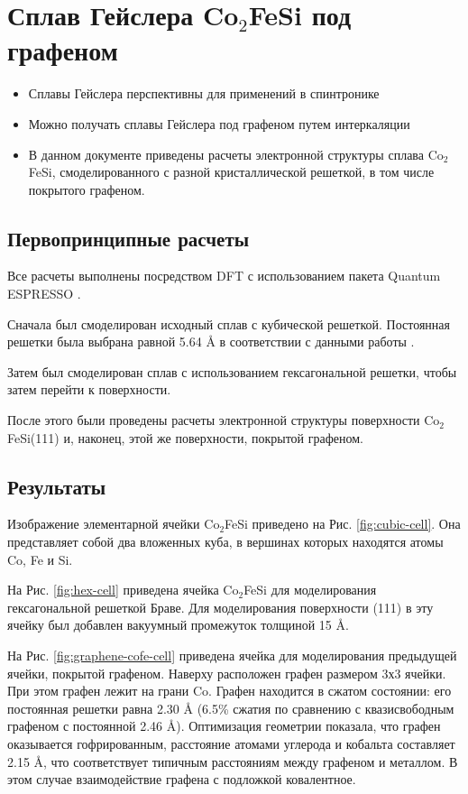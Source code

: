 \chapter{Сплав Гейслера Co$_2$FeSi под графеном}

\begin{itemize}
    \item Сплавы Гейслера перспективны для применений в спинтронике
    \item Можно получать сплавы Гейслера под графеном путем интеркаляции
    \item В данном документе приведены расчеты электронной структуры сплава Co$_2$FeSi, смоделированного с разной кристаллической решеткой, в том числе покрытого графеном.
\end{itemize}

\section{Первопринципные расчеты}

Все расчеты выполнены посредством DFT с использованием пакета Quantum ESPRESSO \cite{espresso}.

Сначала был смоделирован исходный сплав с кубической решеткой. Постоянная решетки была выбрана равной 5.64 Å в соответствии с данными работы \cite{doi:10.1063/1.2166205}.

Затем был смоделирован сплав с использованием гексагональной решетки, чтобы затем перейти к поверхности.

После этого были проведены расчеты электронной структуры поверхности Co$_2$FeSi(111) и, наконец, этой же поверхности, покрытой графеном.

\section{Результаты}

Изображение элементарной ячейки Co$_2$FeSi приведено на Рис. \ref{fig:cubic-cell}. Она представляет собой два вложенных куба, в вершинах которых находятся атомы Co, Fe и Si. 

На Рис. \ref{fig:hex-cell} приведена ячейка Co$_2$FeSi для моделирования гексагональной решеткой Браве. Для моделирования поверхности (111) в эту ячейку был добавлен вакуумный промежуток толщиной 15 Å.

На Рис. \ref{fig:graphene-cofe-cell} приведена ячейка для моделирования предыдущей ячейки, покрытой графеном. Наверху расположен графен размером 3х3 ячейки. При этом графен лежит на грани Co. Графен находится в сжатом состоянии: его постоянная решетки равна 2.30 Å (6.5\% сжатия по сравнению с квазисвободным графеном с постоянной 2.46 Å). Оптимизация геометрии показала, что графен оказывается гофрированным, расстояние атомами углерода и кобальта составляет 2.15 Å, что соответствует типичным расстояниям между графеном и металлом. В этом случае взаимодействие графена с подложкой ковалентное.

